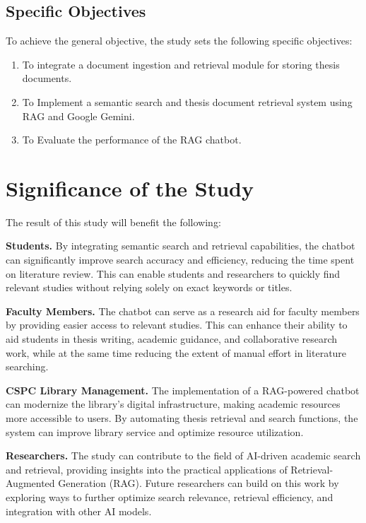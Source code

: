 \begin{refsection}
\subsection{Specific Objectives}

To achieve the general objective, the study sets the following specific objectives:
\begin{enumerate}

    \item To integrate a document ingestion and retrieval module for storing thesis documents.
    \item To Implement a semantic search and thesis document retrieval system using RAG and Google Gemini.
    \item To Evaluate the performance of the RAG chatbot.

\end{enumerate}


\clearpage
\section{Significance of the Study}

The result of this study will benefit the following:

\bigbreak
\noindent \textbf{Students.}  By integrating semantic search and retrieval capabilities, the chatbot can significantly improve search accuracy and efficiency, reducing the time spent on literature review. This can enable students and researchers to quickly find relevant studies without relying solely on exact keywords or titles.

\bigbreak
\noindent \textbf{Faculty Members.}  The chatbot can serve as a research aid for faculty members by providing easier access to relevant studies. This can enhance their ability to aid students in thesis writing, academic guidance, and collaborative research work, while at the same time reducing the extent of manual effort in literature searching.

\bigbreak
\noindent \textbf{CSPC Library Management.} The implementation of a RAG-powered chatbot can modernize the library’s digital infrastructure, making academic resources more accessible to users. By automating thesis retrieval and search functions, the system can improve library service and optimize resource utilization.

\bigbreak
\noindent \textbf{Researchers.} The study can contribute to the field of AI-driven academic search and retrieval, providing insights into the practical applications of Retrieval-Augmented Generation (RAG). Future researchers can build on this work by exploring ways to further optimize search relevance, retrieval efficiency, and integration with other AI models.


\end{refsection}
